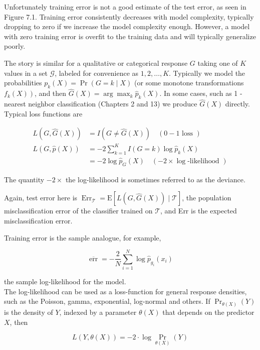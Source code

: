 \documentclass[10pt]{article}
\begin{document}
Unfortunately training error is not a good estimate of the test error, as seen in Figure 7.1. Training error consistently decreases with model complexity, typically dropping to zero if we increase the model complexity enough. However, a model with zero training error is overfit to the training data and will typically generalize poorly.

The story is similar for a qualitative or categorical response $G$ taking one of $K$ values in a set $\mathcal{G}$, labeled for convenience as $1,2, \ldots, K$. Typically we model the probabilities $p_{k}(X)=\operatorname{Pr}(G=k \mid X)$ (or some monotone transformations $\left.f_{k}(X)\right)$, and then $\hat{G}(X)=\arg \max _{k} \hat{p}_{k}(X)$. In some cases, such as 1 -nearest neighbor classification (Chapters 2 and 13) we produce $\hat{G}(X)$ directly. Typical loss functions are


\begin{align*}
L(G, \hat{G}(X)) & =I(G \neq \hat{G}(X)) \quad(0-1 \text { loss })  \tag{7.5}\\
L(G, \hat{p}(X)) & =-2 \sum_{k=1}^{K} I(G=k) \log \hat{p}_{k}(X) \\
& =-2 \log \hat{p}_{G}(X) \quad(-2 \times \log \text {-likelihood }) \tag{7.6}
\end{align*}


The quantity $-2 \times$ the log-likelihood is sometimes referred to as the deviance.

Again, test error here is $\operatorname{Err}_{\mathcal{T}}=\mathrm{E}[L(G, \hat{G}(X)) \mid \mathcal{T}]$, the population misclassification error of the classifier trained on $\mathcal{T}$, and Err is the expected misclassification error.

Training error is the sample analogue, for example,


\begin{equation*}
\overline{\operatorname{err}}=-\frac{2}{N} \sum_{i=1}^{N} \log \hat{p}_{g_{i}}\left(x_{i}\right) \tag{7.7}
\end{equation*}


the sample log-likelihood for the model.\\
The log-likelihood can be used as a loss-function for general response densities, such as the Poisson, gamma, exponential, log-normal and others. If $\operatorname{Pr}_{\theta(X)}(Y)$ is the density of $Y$, indexed by a parameter $\theta(X)$ that depends on the predictor $X$, then


\begin{equation*}
L(Y, \theta(X))=-2 \cdot \log \operatorname{Pr}_{\theta(X)}(Y) \tag{7.8}
\end{equation*}
\end{document}
